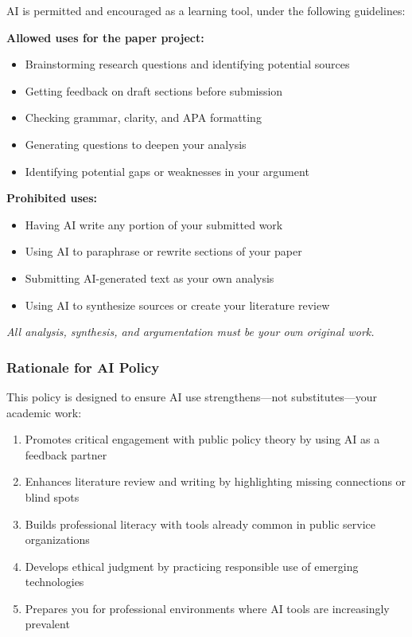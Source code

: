 \documentclass[12pt]{article}     %
\begin{document}
AI is permitted and encouraged as a learning tool, under the following guidelines:

\textbf{Allowed uses for the paper project:}
\begin{itemize}
    \item Brainstorming research questions and identifying potential sources
    \item Getting feedback on draft sections before submission
    \item Checking grammar, clarity, and APA formatting
    \item Generating questions to deepen your analysis
    \item Identifying potential gaps or weaknesses in your argument
\end{itemize}

\textbf{Prohibited uses:}
\begin{itemize}
    \item Having AI write any portion of your submitted work
    \item Using AI to paraphrase or rewrite sections of your paper
    \item Submitting AI-generated text as your own analysis
    \item Using AI to synthesize sources or create your literature review
\end{itemize}

\textit{All analysis, synthesis, and argumentation must be your own original work.}

\subsubsection*{Rationale for AI Policy}

This policy is designed to ensure AI use strengthens---not substitutes---your academic work:

\begin{enumerate}
    \item Promotes critical engagement with public policy theory by using AI as a feedback partner
    \item Enhances literature review and writing by highlighting missing connections or blind spots
    \item Builds professional literacy with tools already common in public service organizations
    \item Develops ethical judgment by practicing responsible use of emerging technologies
    \item Prepares you for professional environments where AI tools are increasingly prevalent
\end{enumerate}
\end{document}
